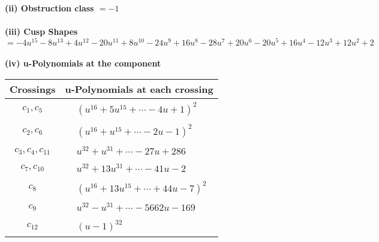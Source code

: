 \documentclass[1p]{elsarticle_modified}
\theoremstyle{definition}
\begin{document}
\flushleft \textbf{(ii) Obstruction class $= -1$}\\~\\
\flushleft \textbf{(iii) Cusp Shapes $= -4 u^{15}-8 u^{13}+4 u^{12}-20 u^{11}+8 u^{10}-24 u^9+16 u^8-28 u^7+20 u^6-20 u^5+16 u^4-12 u^3+12 u^2+2$}\\~\\
\newpage\renewcommand{\arraystretch}{1}
\flushleft \textbf{(iv) u-Polynomials at the component}\newline \\
\begin{tabular}{m{50pt}|m{274pt}}
Crossings & \hspace{64pt}u-Polynomials at each crossing \\
\hline $$\begin{aligned}c_{1},c_{5}\end{aligned}$$&$\begin{aligned}
&(u^{16}+5 u^{15}+\cdots-4 u+1)^{2}
\end{aligned}$\\
\hline $$\begin{aligned}c_{2},c_{6}\end{aligned}$$&$\begin{aligned}
&(u^{16}+u^{15}+\cdots-2 u-1)^{2}
\end{aligned}$\\
\hline $$\begin{aligned}c_{3},c_{4},c_{11}\end{aligned}$$&$\begin{aligned}
&u^{32}+u^{31}+\cdots-27 u+286
\end{aligned}$\\
\hline $$\begin{aligned}c_{7},c_{10}\end{aligned}$$&$\begin{aligned}
&u^{32}+13 u^{31}+\cdots-41 u-2
\end{aligned}$\\
\hline $$\begin{aligned}c_{8}\end{aligned}$$&$\begin{aligned}
&(u^{16}+13 u^{15}+\cdots+44 u-7)^{2}
\end{aligned}$\\
\hline $$\begin{aligned}c_{9}\end{aligned}$$&$\begin{aligned}
&u^{32}- u^{31}+\cdots-5662 u-169
\end{aligned}$\\
\hline $$\begin{aligned}c_{12}\end{aligned}$$&$\begin{aligned}
&(u-1)^{32}
\end{aligned}$\\
\hline
\end{tabular}\\~\\
\end{document}
